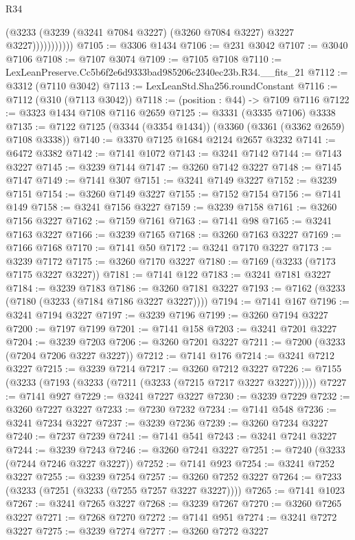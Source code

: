 \begin{lexlean}{R34}
\begin{coremodule}
                      (@3233 (@3239 (@3241 @7084 @3227) (@3260 @7084 @3227) @3227 @3227)))))))))))
@7105 := @3306 @1434
@7106 := @231 @3042
@7107 := @3040 @7106
@7108 := @7107 @3074
@7109 := @7105 @7108
@7110 := LexLeanPreserve.Cc5b6f2e6d9333bad985206c2340ec23b.R34.__fits_21
@7112 := @3312 (@7110 @3042)
@7113 := LexLeanStd.Sha256.roundConstant
@7116 := @7112 (@310 (@7113 @3042))
@7118 := (position : @44) -> @7109 @7116
@7122 := @3323 @1434 @7108 @7116 @2659
@7125 := @3331 (@3335 @7106) @3338
@7135 := @7122 @7125 (@3344 (@3354 @1434)) (@3360 (@3361 (@3362 @2659) @7108 @3338))
@7140 := @3370 @7125 @1684 @2124 @2657 @3232
@7141 := @6472 @3382
@7142 := @7141 @1072
@7143 := @3241 @7142
@7144 := @7143 @3227
@7145 := @3239 @7144
@7147 := @3260 @7142 @3227
@7148 := @7145 @7147
@7149 := @7141 @307
@7151 := @3241 @7149 @3227
@7152 := @3239 @7151
@7154 := @3260 @7149 @3227
@7155 := @7152 @7154
@7156 := @7141 @149
@7158 := @3241 @7156 @3227
@7159 := @3239 @7158
@7161 := @3260 @7156 @3227
@7162 := @7159 @7161
@7163 := @7141 @98
@7165 := @3241 @7163 @3227
@7166 := @3239 @7165
@7168 := @3260 @7163 @3227
@7169 := @7166 @7168
@7170 := @7141 @50
@7172 := @3241 @7170 @3227
@7173 := @3239 @7172
@7175 := @3260 @7170 @3227
@7180 := @7169 (@3233 (@7173 @7175 @3227 @3227))
@7181 := @7141 @122
@7183 := @3241 @7181 @3227
@7184 := @3239 @7183
@7186 := @3260 @7181 @3227
@7193 := @7162 (@3233 (@7180 (@3233 (@7184 @7186 @3227 @3227))))
@7194 := @7141 @167
@7196 := @3241 @7194 @3227
@7197 := @3239 @7196
@7199 := @3260 @7194 @3227
@7200 := @7197 @7199
@7201 := @7141 @158
@7203 := @3241 @7201 @3227
@7204 := @3239 @7203
@7206 := @3260 @7201 @3227
@7211 := @7200 (@3233 (@7204 @7206 @3227 @3227))
@7212 := @7141 @176
@7214 := @3241 @7212 @3227
@7215 := @3239 @7214
@7217 := @3260 @7212 @3227
@7226 := @7155 (@3233 (@7193 (@3233 (@7211 (@3233 (@7215 @7217 @3227 @3227))))))
@7227 := @7141 @927
@7229 := @3241 @7227 @3227
@7230 := @3239 @7229
@7232 := @3260 @7227 @3227
@7233 := @7230 @7232
@7234 := @7141 @548
@7236 := @3241 @7234 @3227
@7237 := @3239 @7236
@7239 := @3260 @7234 @3227
@7240 := @7237 @7239
@7241 := @7141 @541
@7243 := @3241 @7241 @3227
@7244 := @3239 @7243
@7246 := @3260 @7241 @3227
@7251 := @7240 (@3233 (@7244 @7246 @3227 @3227))
@7252 := @7141 @923
@7254 := @3241 @7252 @3227
@7255 := @3239 @7254
@7257 := @3260 @7252 @3227
@7264 := @7233 (@3233 (@7251 (@3233 (@7255 @7257 @3227 @3227))))
@7265 := @7141 @1023
@7267 := @3241 @7265 @3227
@7268 := @3239 @7267
@7270 := @3260 @7265 @3227
@7271 := @7268 @7270
@7272 := @7141 @951
@7274 := @3241 @7272 @3227
@7275 := @3239 @7274
@7277 := @3260 @7272 @3227

\end{coremodule}
\end{lexlean}
